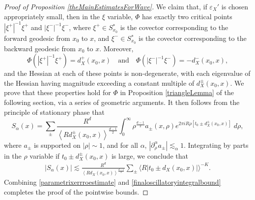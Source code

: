 \begin{proof}[Proof of Proposition \ref{theMainEstimatesForWave}]
%
%
%
We claim that, if $\varepsilon_X'$ is chosen appropriately small, then in the $\xi$ variable, $\Phi$ has exactly two critical points $|\xi^+|^{-1} \xi^+$ and $|\xi^-|^{-1} \xi^-$, where $\xi^+ \in S\!_{x_0}^*$ is the covector corresponding to the forward geodesic from $x_0$ to $x$, and $\xi^- \in S\!_{x_0}^*$ is the covector corresponding to the backward geodesic from $x_0$ to $x$. Moreover,
%
\begin{equation}
    \Phi(|\xi^+|^{-1} \xi^+) = d_X^+(x_0,x) \quad\text{and}\quad \Phi(|\xi^-|^{-1} \xi^-) = - d_X^-(x_0,x),
\end{equation}
%
and the Hessian at each of these points is non-degenerate, with each eigenvalue of the Hessian having magnitude exceeding a constant multiple of $d_X^{\pm}(x_0,x)$. We prove that these properties hold for $\Phi$ in Proposition \ref{triangleLemma} of the following section, via a series of geometric arguments. It then follows from the principle of stationary phase that
%
\begin{equation}
    S\!_\alpha(x) = \sum_{\pm} \frac{R^{d}}{\left\langle R d_X^{\pm}(x_0,x) \right\rangle^{\frac{d-1}{2}}} \int_0^\infty \rho^{\frac{d-1}{2}} a_{\pm}(x,\rho) e^{2 \pi i R \rho [ t_0 \pm d_X^{\pm}(x_0,x)]}\; d\rho,
\end{equation}
%
where $a_{\pm}$ is supported on $|\rho| \sim 1$, and for all $\alpha$, $|\partial_\rho^\alpha a_{\pm}| \lesssim_\alpha 1$. Integrating by parts in the $\rho$ variable if $t_0 \pm d_X^{\pm}(x_0,x)$ is large, we conclude that
%
%
% 
% 
%
\begin{equation} \label{finaloscillatoryintegralbound}
\begin{split}
    |S\!_\alpha(x)| \lesssim \frac{R^{d}}{\left\langle R d_X(x_0,x) \right\rangle^{\frac{d-1}{2}}} \sum_{\pm} \big\langle R |t_0 \pm d_X(x_0,x)| \big\rangle^{-K}.
\end{split}
\end{equation}
%
Combining \eqref{parametrixerrroestimate} and \eqref{finaloscillatoryintegralbound} completes the proof of the pointwise bounds.


\end{proof}
